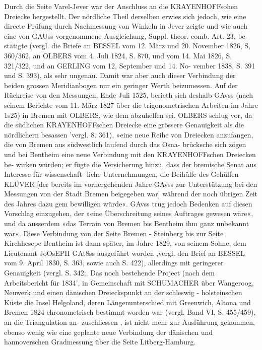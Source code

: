 \documentclass[12pt,a4paper]{article}
\theoremstyle{plain}
\theoremstyle{definition}
\theoremstyle{remark}
\begin{document}
\noindent
Durch die Seite Varel-Jever war der Anschluss an die KRAYENHOFFsohen Dreiecke hergestellt. Der
nördliche Theil derselben erwies sich jedoch, wie eine directe Prüfung durch Nachmessung von Winkeln in
Jever zeigte und wie auch eine von GAUss vorgenommene Ausgleichung, Suppl. theor. comb. Art. 23, be-
stätigte (vergl. die Briefe an BESSEL vom 12. März und 20. November 1826, S, 360/362, an OLBERS vom
4. Juli 1824, S. 870, und vom 14. Mai 1826, S, 321/322, und an GERLING vom 12, September und 14. No-
vember 1838, S. 391 und S. 393), als sehr ungenau. Damit war aber auch dieser Verbindung der beiden
grossen Meridianbogen nur ein geringer Werth beizumessen. Auf der Rückreise von den Messungen, Ende
Juli 1525, berieth sich deshalb GAvss (nach seinem Berichte vom 11. März 1827 über die trigonometrischen
Arbeiten im Jahre 1s25) in Bremen mit OLBERS, wie dem abzuhelfen sei. OLBERS schlug vor, da die
südlichen KRAYENHOFFschen Dreiecke eine grössere Genauigkeit als die nördlichern besassen 'vergl. 8. 361),
»eine neue Reihe von Dreiecken anzufangen, die von Bremen aus südwestlich laufend durch das Osna-
brücksche sich zögen und bei Bentheim eine neue Verbindung mit den KRAYENHOFFschen Dreiecken be-
wirken würden; er fügte die Versicherung hinzu, dass der bremische Senat aus Interesse für wissenschaft-
liche Unternehmungen, die Beihülfe des Gehülfen KLÜVER [der bereits im vorhergehenden Jahre GAvss zur
Unterstützung bei den Messungen von der Stadt Bremen beigegeben war] während der noch übrigen Zeit
des Jahres dazu gem bewilligen würde«. GAvss trug jedoch Bedenken auf diesen Vorschlag einzugehen,
der »eine Überschreitung seines Auftrages gewesen wäre«, und da ausserdem »das Terrain von Bremen bis
Bentheim ihm ganz unbekannt war«. Diese Verbindung von der Seite Bremen - Steinberg bis zur Seite
Kirchhesepe-Bentheim ist dann später, im Jahre 1829, von seinem Sohne, dem Lieutenant JoOsEPH GAt8ss
ausgeführt worden ,vergl. den Brief an BESSEL vom 9. April 1830, S. 363, sowie auch S. 422), allerdings
mit geringerer Genauigkeit (vergl. S. 342;. Das noch bestehende Project (nach dem Arbeitsbericht für 1834',
in Gemeinschaft mit SCHUMACHER über Wangeroog, Neuwerk und einen dänischen Dreieckspunkt an der
schleswig - holsteinschen Küste die Insel Helgoland, deren Längenunterschied mit Greenwich, Altona und
Bremen 1824 chronometrisch bestimmt worden war (vergl. Band VI, S. 455/459), an die Triangulation an-
zuschliessen , ist nicht mehr zur Ausführung gekommen, ebenso wenig wie eine geplante neue Verbindung
der dänischen und hannoverschen Gradmessung über die Seite Litberg-Hamburg.
\end{document}
